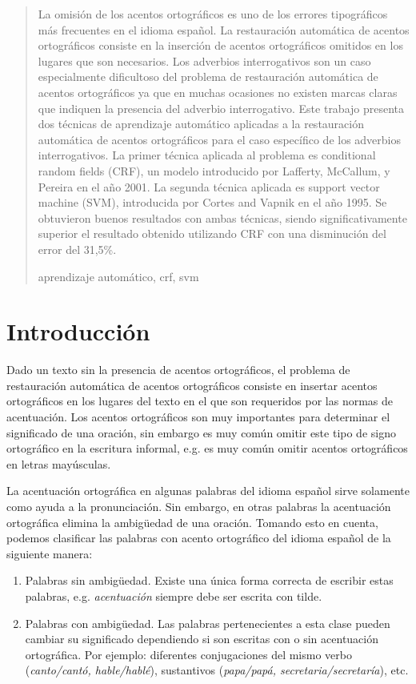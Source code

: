 \documentclass[runningheads,a4paper]{llncs}
\newcommand{\keywords}[1]{\par\addvspace\baselineskip
\noindent\keywordname\enspace\ignorespaces#1}
\begin{document}
\begin{abstract}
La omisión de los acentos ortográficos es uno de los errores tipográficos más frecuentes en el idioma español. La restauración automática de acentos ortográficos consiste en la inserción de acentos ortográficos omitidos en los lugares que son necesarios. Los adverbios interrogativos son un caso especialmente dificultoso del problema de restauración automática de acentos ortográficos ya que en muchas ocasiones no existen marcas claras que indiquen la presencia del adverbio interrogativo. Este trabajo presenta dos técnicas de aprendizaje automático aplicadas a la restauración automática de acentos ortográficos para el caso específico de los adverbios interrogativos. La primer técnica aplicada al problema es conditional random fields (CRF), un modelo introducido por Lafferty, McCallum, y Pereira\cite{LAFFERTY01} en el año 2001. La segunda técnica aplicada es support vector machine (SVM),  introducida por Cortes and Vapnik\cite{CORTES95} en el año 1995. Se obtuvieron buenos resultados con ambas t\'ecnicas, siendo significativamente superior el resultado obtenido utilizando CRF con una disminuci\'on del error del 31,5\%.
\keywords{aprendizaje automático, crf, svm}
\end{abstract}

\section{Introducción}
Dado un texto sin la presencia de acentos ortográficos, el problema de restauración automática de acentos ortográficos consiste en insertar acentos ortográficos en los lugares del texto en el que son requeridos por las normas de acentuación. Los acentos ortográficos son muy importantes para determinar el significado de una oración, sin embargo es muy común omitir este tipo de signo ortográfico en la escritura informal, e.g. es muy común omitir acentos ortográficos en letras mayúsculas.

La acentuación ortográfica en algunas palabras del idioma español sirve solamente como ayuda a la pronunciación. Sin embargo, en otras palabras la acentuación ortográfica elimina la ambigüedad de una oración. Tomando esto en cuenta, podemos clasificar las palabras con acento ortográfico del idioma español de la siguiente manera\cite{CRANDALL95}:
\begin{enumerate}
\item{Palabras sin ambigüedad}. Existe una única forma correcta de escribir estas palabras, e.g. \emph{acentuación} siempre debe ser escrita con tilde.
\item{Palabras con ambigüedad}. Las palabras pertenecientes a esta clase pueden cambiar su significado dependiendo si son escritas con o sin acentuación ortográfica. Por ejemplo: diferentes conjugaciones del mismo verbo (\emph{canto/cantó, hable/hablé}), sustantivos (\emph{papa/papá, secretaria/secretaría}), etc.
\end{enumerate}
\end{document}
